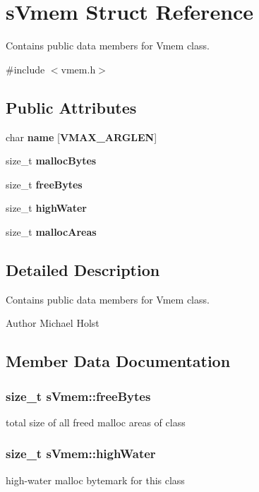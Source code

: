 \section{s\-Vmem Struct Reference}
\label{a00003}


Contains public data members for Vmem class.  




{\ttfamily \#include $<$vmem.\-h$>$}

\subsection*{Public Attributes}
\begin{DoxyCompactItemize}
\item 
char {\bf name} [{\bf V\-M\-A\-X\-\_\-\-A\-R\-G\-L\-E\-N}]
\item 
size\-\_\-t {\bf malloc\-Bytes}
\item 
size\-\_\-t {\bf free\-Bytes}
\item 
size\-\_\-t {\bf high\-Water}
\item 
size\-\_\-t {\bf malloc\-Areas}
\end{DoxyCompactItemize}


\subsection{Detailed Description}
Contains public data members for Vmem class. 

\begin{DoxyAuthor}{Author}
Michael Holst 
\end{DoxyAuthor}


\subsection{Member Data Documentation}
\subsubsection[{free\-Bytes}]{\setlength{\rightskip}{0pt plus 5cm}size\-\_\-t s\-Vmem\-::free\-Bytes}\label{a00003_ab27fc8fe9d21afcea1873ad370fd908b}
total size of all freed malloc areas of class 
\subsubsection[{high\-Water}]{\setlength{\rightskip}{0pt plus 5cm}size\-\_\-t s\-Vmem\-::high\-Water}\label{a00003_af47cf8b9bda257c19cf2866e14be131d}
high-\/water malloc bytemark for this class 
